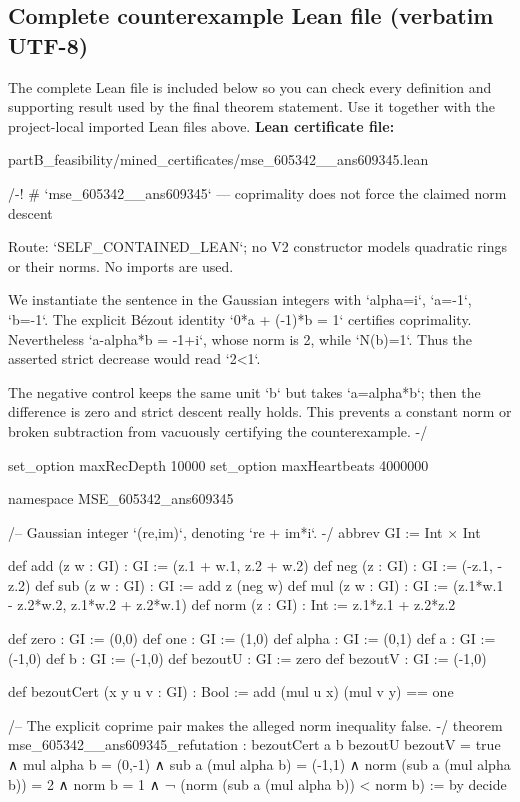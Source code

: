 \documentclass[11pt]{article}
\begin{document}
\subsection*{Complete counterexample Lean file (verbatim UTF-8)}
The complete Lean file is included below so you can check every definition and supporting result used by the final theorem statement. Use it together with the project-local imported Lean files above.
\textbf{Lean certificate file:}
\begin{Vsrc}
partB_feasibility/mined_certificates/mse_605342__ans609345.lean
\end{Vsrc}
\begin{Vlean}
/-!
# `mse_605342__ans609345` — coprimality does not force the claimed norm descent

Route: `SELF_CONTAINED_LEAN`; no V2 constructor models quadratic rings or their norms.
No imports are used.

We instantiate the sentence in the Gaussian integers with `alpha=i`, `a=-1`, `b=-1`.
The explicit Bézout identity `0*a + (-1)*b = 1` certifies coprimality.  Nevertheless
`a-alpha*b = -1+i`, whose norm is 2, while `N(b)=1`.  Thus the asserted strict decrease
would read `2<1`.

The negative control keeps the same unit `b` but takes `a=alpha*b`; then the difference
is zero and strict descent really holds.  This prevents a constant norm or broken
subtraction from vacuously certifying the counterexample.
-/

set_option maxRecDepth 10000
set_option maxHeartbeats 4000000

namespace MSE_605342_ans609345

/-- Gaussian integer `(re,im)`, denoting `re + im*i`. -/
abbrev GI := Int × Int

def add (z w : GI) : GI := (z.1 + w.1, z.2 + w.2)
def neg (z : GI) : GI := (-z.1, -z.2)
def sub (z w : GI) : GI := add z (neg w)
def mul (z w : GI) : GI := (z.1*w.1 - z.2*w.2, z.1*w.2 + z.2*w.1)
def norm (z : GI) : Int := z.1*z.1 + z.2*z.2

def zero : GI := (0,0)
def one : GI := (1,0)
def alpha : GI := (0,1)
def a : GI := (-1,0)
def b : GI := (-1,0)
def bezoutU : GI := zero
def bezoutV : GI := (-1,0)

def bezoutCert (x y u v : GI) : Bool := add (mul u x) (mul v y) == one

/-- The explicit coprime pair makes the alleged norm inequality false. -/
theorem mse_605342__ans609345_refutation :
    bezoutCert a b bezoutU bezoutV = true
      ∧ mul alpha b = (0,-1)
      ∧ sub a (mul alpha b) = (-1,1)
      ∧ norm (sub a (mul alpha b)) = 2
      ∧ norm b = 1
      ∧ ¬ (norm (sub a (mul alpha b)) < norm b) := by
  decide


\end{Vlean}
\end{document}
